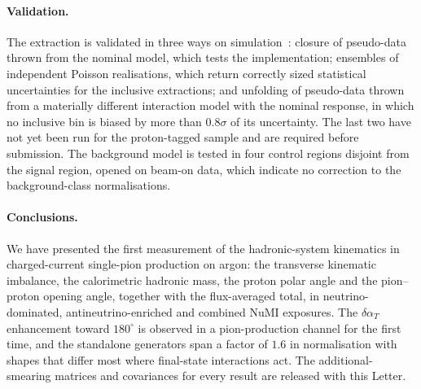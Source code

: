 \documentclass[aps,prl,twocolumn,superscriptaddress,nofootinbib,floatfix]{revtex4-2}
\begin{document}
\paragraph*{Validation.}
The extraction is validated in three ways on simulation~\cite{companion_prd}: closure of
pseudo-data thrown from the nominal model, which tests the implementation; ensembles of
independent Poisson realisations, which return correctly sized statistical uncertainties for the
inclusive extractions; and unfolding of pseudo-data thrown from a materially different interaction
model with the nominal response, in which no inclusive bin is biased by more than $0.8\sigma$ of its
uncertainty. The last two have not yet been run for the proton-tagged sample and are required
before submission. The background model is tested in four control regions disjoint from the
signal region, opened on beam-on data, which indicate no correction to the background-class
normalisations.

\paragraph*{Conclusions.}
We have presented the first measurement of the hadronic-system kinematics in charged-current
single-pion production on argon: the transverse kinematic imbalance, the calorimetric hadronic
mass, the proton polar angle and the pion--proton opening angle, together with the flux-averaged
total, in neutrino-dominated, antineutrino-enriched and combined NuMI exposures. The
$\delta\alpha_T$ enhancement toward $180^\circ$ is observed in a pion-production channel for the
first time, and the standalone generators span a factor of $1.6$ in normalisation with shapes that
differ most where final-state interactions act. The additional-smearing matrices and covariances
for every result are released with this Letter.

\begin{acknowledgments}
\end{acknowledgments}


\end{document}

